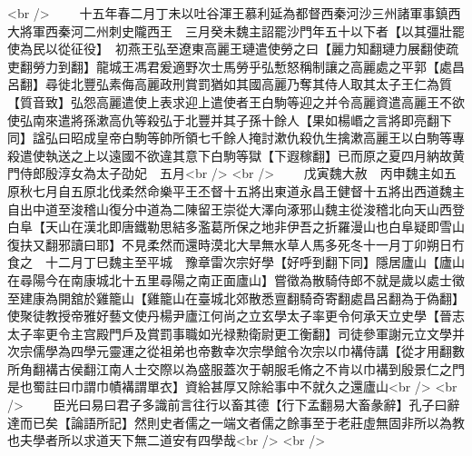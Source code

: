 <br />
　　十五年春二月丁未以吐谷渾王慕利延為都督西秦河沙三州諸軍事鎮西大將軍西秦河二州刺史隴西王　三月癸未魏主詔罷沙門年五十以下者【以其彊壯罷使為民以從征役】　初燕王弘至遼東高麗王璉遣使勞之曰【麗力知翻璉力展翻使疏吏翻勞力到翻】龍城王馮君爰適野次士馬勞乎弘慙怒稱制讓之高麗處之平郭【處昌呂翻】尋徙北豐弘素侮高麗政刑賞罰猶如其國高麗乃奪其侍人取其太子王仁為質【質音致】弘怨高麗遣使上表求迎上遣使者王白駒等迎之并令高麗資遣高麗王不欲使弘南來遣將孫漱高仇等殺弘于北豐并其子孫十餘人【果如楊㟭之言將即亮翻下同】諡弘曰昭成皇帝白駒等帥所領七千餘人掩討漱仇殺仇生擒漱高麗王以白駒等專殺遣使執送之上以遠國不欲違其意下白駒等獄【下遐稼翻】已而原之夏四月納故黄門侍郎殷淳女為太子劭妃　五月<br />
<br />
　　戊寅魏大赦　丙申魏主如五原秋七月自五原北伐柔然命樂平王丕督十五將出東道永昌王健督十五將出西道魏主自出中道至浚稽山復分中道為二陳留王崇從大澤向涿邪山魏主從浚稽北向天山西登白阜【天山在漢北即唐鐵勒思結多濫葛所保之地非伊吾之折羅漫山也白阜疑即雪山復扶又翻邪讀曰耶】不見柔然而還時漠北大旱無水草人馬多死冬十一月丁卯朔日冇食之　十二月丁巳魏主至平城　豫章雷次宗好學【好呼到翻下同】隱居廬山【廬山在尋陽今在南康城北十五里尋陽之南正面廬山】嘗徵為散騎侍郎不就是歲以處士徵至建康為開舘於雞籠山【雞籠山在臺城北郊散悉亶翻騎奇寄翻處昌呂翻為于偽翻】使聚徒教授帝雅好藝文使丹楊尹廬江何尚之立玄學太子率更令何承天立史學【晉志太子率更令主宫殿門戶及賞罰事職如光禄勲衛尉更工衡翻】司徒參軍謝元立文學并次宗儒學為四學元靈運之從祖弟也帝數幸次宗學館令次宗以巾褠侍講【從才用翻數所角翻褠古侯翻江南人士交際以為盛服蓋次于朝服毛脩之不肯以巾褠到殷景仁之門是也蜀註曰巾謂巾幘褠謂單衣】資給甚厚又除給事中不就久之還廬山<br />
<br />
　　臣光曰易曰君子多識前言往行以畜其德【行下孟翻易大畜彖辭】孔子曰辭達而已矣【論語所記】然則史者儒之一端文者儒之餘事至于老莊虛無固非所以為教也夫學者所以求道天下無二道安有四學哉<br />
<br />
